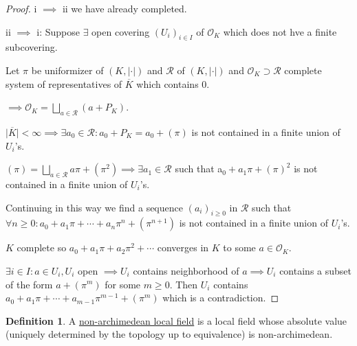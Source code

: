 \documentclass[openany]{amsbook}
\numberwithin{section}{chapter}
\theoremstyle{definition}
\newtheorem*{definition}{Definition}
\begin{document}
\begin{proof}
    i \(\implies\) ii we have already completed.

    ii \(\implies\) i: Suppose \(\exists\) open covering \((U_i)_{i\in I}\) of \(\mathcal{O}_K\) which does not hve a finite subcovering.

    Let \(\pi\) be uniformizer of \((K,\vert \cdot \vert)\) and \(\mathscr{R}\) of \((K,\vert \cdot \vert)\) and \(\mathcal{O}_K \supset \mathscr{R}\) complete system of representatives of \(\overline{K}\) which contains \(0\).

    \(\implies \mathcal{O}_K = \bigsqcup_{a\in \mathscr{R}} (a+P_K)\).
    
    \(\vert \overline{K} \vert < \infty \implies \exists a_0 \in \mathscr{R} : a_0 + P_K = a_0 + (\pi)\) is not contained in a finite union of \(U_i\)'s.

    \((\pi) = \bigsqcup_{a\in \mathscr{R}} a \pi + (\pi^2) \implies \exists a_1 \in \mathscr{R}\) such that a\(_0 + a_1 \pi + (\pi)^2\) is not contained in a finite union of \(U_i\)'s.

    Continuing in this way we find a sequence \((a_i)_{i \geq 0}\) in \(\mathscr{R}\) such that \(\forall n \geq 0: a_0 + a_1 \pi + \cdots + a_n \pi^n + (\pi^{n+1})\) is not contained in a finite union of \(U_i\)'s.

    \(K\) complete so \(a_0 + a_1 \pi + a_2 \pi ^2 + \cdots\) converges in \(K\) to some \(a\in \mathcal{O}_K\). 

    \(\exists i\in I : a\in U_i, U_i\)  open \(\implies U_i\) contains neighborhood of \(a \implies U_i\) contains a subset of the form \(a+ (\pi^m)\) for some \(m \geq 0\). Then \(U_i\) contains \(a_0 + a_1 \pi + \cdots + a_{m-1} \pi^{m-1} +(\pi^m)\) which is a contradiction.  

\end{proof}

\begin{definition}
    A \underline{non-archimedean local field} is a local field whose absolute value (uniquely determined by the topology up to equivalence) is non-archimedean. 
\end{definition}
\end{document}
